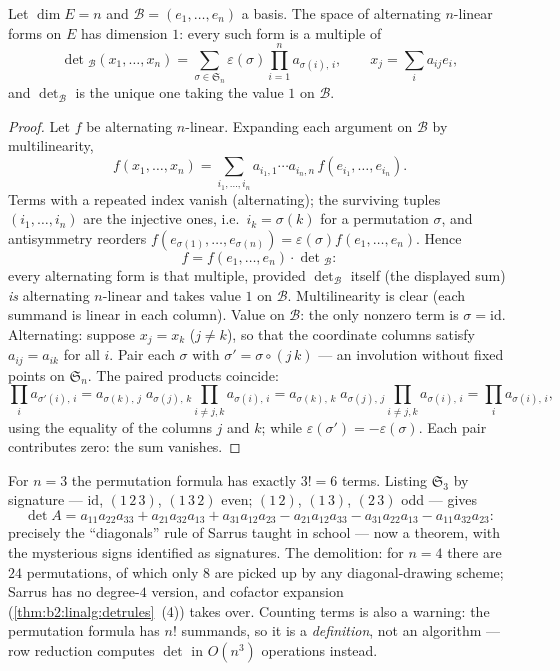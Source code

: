 \begin{theorem}\label{thm:b2:linalg:detspace}
Let $\dim E = n$ and $\mathcal{B} = (e_1, \dots, e_n)$ a basis. The
space of alternating $n$-linear forms on $E$ has dimension $1$:
every such form is a multiple of
\[
\det{}_{\mathcal{B}}(x_1, \dots, x_n)
= \sum_{\sigma \in \mathfrak{S}_n} \varepsilon(\sigma)
\prod_{i=1}^{n} a_{\sigma(i),\,i},
\qquad
x_j = \sum_{i} a_{ij} e_i ,
\]
and $\det_{\mathcal{B}}$ is the unique one taking the value $1$ on
$\mathcal{B}$.
\end{theorem}

\begin{proof}
Let $f$ be alternating $n$-linear. Expanding each argument on
$\mathcal{B}$ by multilinearity,
\[
f(x_1, \dots, x_n)
= \sum_{i_1, \dots, i_n} a_{i_1,1}\cdots a_{i_n,n}\,
f(e_{i_1}, \dots, e_{i_n}).
\]
Terms with a repeated index vanish (alternating); the surviving
tuples $(i_1, \dots, i_n)$ are the injective ones, i.e.\ $i_k =
\sigma(k)$ for a permutation $\sigma$, and antisymmetry reorders
$f(e_{\sigma(1)}, \dots, e_{\sigma(n)}) = \varepsilon(\sigma)
f(e_1, \dots, e_n)$. Hence
\[
f = f(e_1, \dots, e_n) \cdot \det{}_{\mathcal{B}} :
\]
every alternating form is that multiple, provided
$\det_{\mathcal{B}}$ itself (the displayed sum) \emph{is}
alternating $n$-linear and takes value $1$ on $\mathcal B$.
Multilinearity is clear (each summand is linear in each column).
Value on $\mathcal B$: the only nonzero term is $\sigma =
\mathrm{id}$. Alternating: suppose $x_j = x_k$ ($j \neq k$), so
that the coordinate columns satisfy $a_{i j} = a_{i k}$ for all
$i$. Pair each $\sigma$ with $\sigma' = \sigma\circ(j\,k)$ ---
an involution without fixed points on $\mathfrak{S}_n$. The
paired products coincide:
\[
\prod_i a_{\sigma'(i),\,i}
= a_{\sigma(k),\,j}\; a_{\sigma(j),\,k}
\prod_{i \neq j,k} a_{\sigma(i),\,i}
= a_{\sigma(k),\,k}\; a_{\sigma(j),\,j}
\prod_{i \neq j,k} a_{\sigma(i),\,i}
= \prod_i a_{\sigma(i),\,i},
\]
using the equality of the columns $j$ and $k$; while
$\varepsilon(\sigma') = -\varepsilon(\sigma)$. Each pair
contributes zero: the sum vanishes.
\end{proof}

\begin{example}\label{ex:b2:linalg:sarrus}
For $n = 3$ the permutation formula has exactly $3! = 6$ terms.
Listing $\mathfrak{S}_3$ by signature ---
$\mathrm{id}$, $(1\,2\,3)$, $(1\,3\,2)$ even;
$(1\,2)$, $(1\,3)$, $(2\,3)$ odd --- gives
\[
\det A = a_{11}a_{22}a_{33} + a_{21}a_{32}a_{13} +
a_{31}a_{12}a_{23}
- a_{21}a_{12}a_{33} - a_{31}a_{22}a_{13} -
a_{11}a_{32}a_{23} :
\]
precisely the ``diagonals'' rule of Sarrus taught in school ---
now a theorem, with the mysterious signs identified as
signatures. The demolition: for $n = 4$ there are $24$
permutations, of which only $8$ are picked up by any
diagonal-drawing scheme; Sarrus has no degree-$4$ version, and
cofactor expansion (\cref{thm:b2:linalg:detrules}~(4)) takes
over. Counting terms is also a warning: the permutation formula
has $n!$ summands, so it is a \emph{definition}, not an
algorithm --- row reduction computes $\det$ in $O(n^3)$
operations instead.
\end{example}

